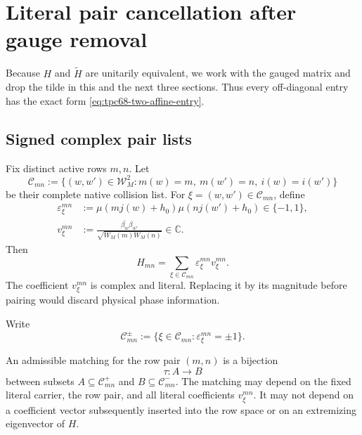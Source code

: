 \section{Literal pair cancellation after gauge removal}
\label{sec:tpc68-gauge-pairing}

Because \(H\) and \(\widetilde H\) are unitarily equivalent, we work with
the gauged matrix and drop the tilde in this and the next three sections.
Thus every off-diagonal entry has the exact form
\eqref{eq:tpc68-two-affine-entry}.

\subsection{Signed complex pair lists}

Fix distinct active rows \(m,n\).  Let
\[
 \mathcal C_{mn}
 :=
 \{(w,w')\in\mathcal W_M^2:
 m(w)=m,\ m(w')=n,\ i(w)=i(w')\}
\]
be their complete native collision list.  For
\(\xi=(w,w')\in\mathcal C_{mn}\), define
\begin{align}
 \varepsilon_\xi^{mn}
 &:=
 \mu(mj(w)+h_0)\mu(nj(w')+h_0)\in\{-1,1\},
 \label{eq:tpc68-pair-sign}\\
 v_\xi^{mn}
 &:=
 \frac{\overline{\beta_w}\beta_{w'}}
 {\sqrt{W_M(m)W_M(n)}}\in\mathbb C.
 \label{eq:tpc68-pair-complex-weight}
\end{align}
Then
\begin{equation}
 H_{mn}=\sum_{\xi\in\mathcal C_{mn}}
 \varepsilon_\xi^{mn}v_\xi^{mn}.
 \label{eq:tpc68-literal-pair-list}
\end{equation}
The coefficient \(v_\xi^{mn}\) is complex and literal.  Replacing it by its
magnitude before pairing would discard physical phase information.

Write
\[
 \mathcal C_{mn}^{\pm}
 :=\{\xi\in\mathcal C_{mn}:\varepsilon_\xi^{mn}=\pm1\}.
\]

\begin{definition}
\label{def:tpc68-admissible-pairing}
An admissible matching for the row pair \((m,n)\) is a bijection
\[
 \tau:A\longrightarrow B
\]
between subsets \(A\subseteq\mathcal C_{mn}^{+}\) and
\(B\subseteq\mathcal C_{mn}^{-}\).  The matching may depend on the fixed
literal carrier, the row pair, and all literal coefficients
\(v_\xi^{mn}\).  It may not depend on a coefficient vector subsequently
inserted into the row space or on an extremizing eigenvector of \(H\).
\end{definition}

